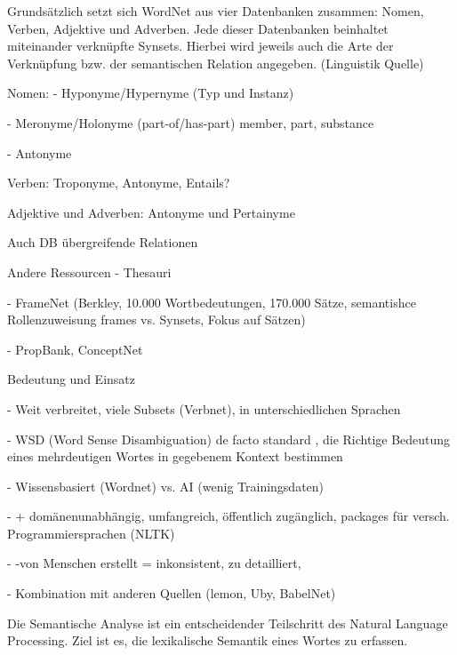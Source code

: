 Grundsätzlich setzt sich WordNet aus vier Datenbanken zusammen: Nomen, Verben, Adjektive und Adverben. Jede dieser Datenbanken beinhaltet miteinander verknüpfte Synsets. Hierbei wird jeweils auch die Arte der Verknüpfung bzw. der semantischen Relation angegeben. (Linguistik Quelle)



Nomen:
-	Hyponyme/Hypernyme (Typ und Instanz)

-	Meronyme/Holonyme (part-of/has-part) member, part, substance

-	Antonyme

Verben: Troponyme, Antonyme, Entails?

Adjektive und Adverben: Antonyme und Pertainyme

Auch DB übergreifende Relationen


Andere Ressourcen
-	Thesauri

-	FrameNet (Berkley, 10.000 Wortbedeutungen, 170.000
Sätze, semantishce Rollenzuweisung frames vs. Synsets, Fokus auf Sätzen)

-	PropBank, ConceptNet

Bedeutung und Einsatz

-	Weit verbreitet, viele Subsets (Verbnet), in unterschiedlichen Sprachen

-	WSD (Word Sense Disambiguation) de facto standard , die Richtige Bedeutung eines mehrdeutigen Wortes in gegebenem Kontext bestimmen

-	Wissensbasiert (Wordnet) vs. AI (wenig Trainingsdaten)

-	+ domänenunabhängig, umfangreich, öffentlich zugänglich, packages für versch. Programmiersprachen (NLTK)

-	-von Menschen erstellt = inkonsistent, zu detailliert,
 
-	Kombination mit anderen Quellen (lemon, Uby, BabelNet)

Die Semantische Analyse ist ein entscheidender Teilschritt des Natural Language Processing. Ziel ist es, die lexikalische Semantik eines Wortes zu erfassen.
